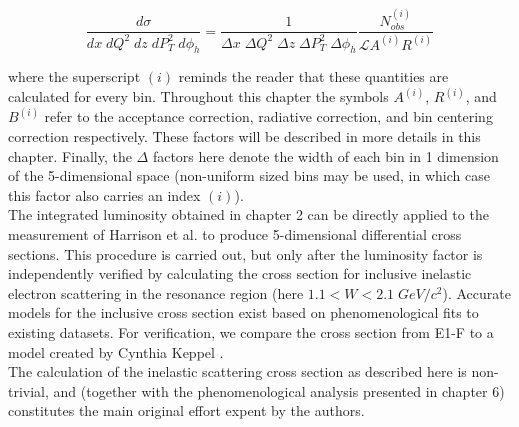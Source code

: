 \begin{equation}
	\frac{d\sigma}{dx \; dQ^2 \; dz \; dP_T^2 \; d\phi_h} = \frac{1}{\Delta x \; \Delta Q^2 \; \Delta z \; \Delta P_T^2 \; \Delta \phi_h} \frac{N_{obs}^{(i)}}{\mathcal{L} A^{(i)} R^{(i)}} 
\end{equation}

where the superscript $(i)$ reminds the reader that these quantities are calculated for every bin.  Throughout this chapter the symbols $A^{(i)}$, $R^{(i)}$, and $B^{(i)}$ refer to the acceptance correction, radiative correction, and bin centering correction respectively.  These factors will be described in more details in this chapter. Finally, the $\Delta$ factors here denote the width of each bin in 1 dimension of the 5-dimensional space (non-uniform sized bins may be used, in which case this factor also carries an index $(i)$).\\

The integrated luminosity obtained in chapter 2 can be directly applied to the measurement of Harrison et al. to produce 5-dimensional differential cross sections.  This procedure is carried out, but only after the luminosity factor is independently verified by calculating the cross section for inclusive inelastic electron scattering in the resonance region (here $1.1 < W < 2.1 \; GeV/c^2$).  Accurate models for the inclusive cross section exist based on phenomenological fits to existing datasets.  For verification, we compare the cross section from E1-F to a model created by Cynthia Keppel \cite{find-keppel-reference}. \\

The calculation of the inelastic scattering cross section as described here is non-trivial, and (together with the phenomenological analysis presented in chapter 6) constitutes the main original effort expent by the authors.    

